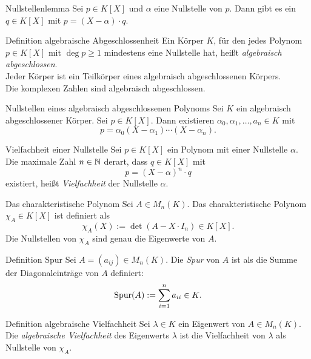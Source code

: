 \documentclass[main.tex]{subfiles}
\begin{document}
\begin{karte}{Nullstellenlemma}
    Sei \( p \in K[X] \) und \( \alpha \) eine Nullstelle 
    von \( p \). Dann gibt es ein \( q\in K[X] \) mit 
    \( p = (X - \alpha) \cdot q \).
\end{karte}
\begin{karte}{Definition algebraische Abgeschlossenheit}
    Ein Körper \( K \), für den jedes Polynom 
    \( p \in K[X] \) mit \( \deg p \geq 1 \) mindestens eine 
    Nullstelle hat, heißt \textit{algebraisch abgeschlossen}.\\
    Jeder Körper ist ein Teilkörper eines algebraisch 
    abgeschlossenen Körpers.\\
    Die komplexen Zahlen sind algebraisch abgeschlossen.
\end{karte}
\begin{karte}{Nullstellen eines algebraisch abgeschlossenen Polynoms}
    Sei \(K\) ein algebraisch abgeschlossener Körper. Sei 
    \( p \in K[X] \). Dann existieren 
    \( \alpha_0, \alpha_1, \ldots, a_n \in K \) mit 
    \[ p = \alpha_0 (X - \alpha_1) \cdots (X - \alpha_n). \]
\end{karte}
\begin{karte}{Vielfachheit einer Nullstelle}
    Sei \( p \in K[X] \) ein Polynom mit einer Nullstelle 
    \( \alpha \). Die maximale Zahl \( n \in \mathbb{N} \) derart, 
    dass \( q \in K[X] \) mit 
    \[ p = {(X - \alpha)}^n \cdot q \]
    existiert, heißt \textit{Vielfachheit} der Nullstelle 
    \( \alpha \).
\end{karte}
\begin{karte}{Das charakteristische Polynom}
    Sei \( A \in M_n(K) \). Das charakteristische Polynom 
    \( \chi_A \in K[X] \) ist definiert als 
    \[ \chi_A(X) := \det(A - X \cdot I_n) \in K[X]. \]
    Die Nullstellen von \( \chi_A \) sind genau die Eigenwerte 
    von \(A\).
\end{karte}
\begin{karte}{Definition Spur}
    Sei \( A = (a_{ij}) \in M_n(K) \). Die \textit{Spur} von 
    \(A\) ist als die Summe der Diagonaleinträge von \(A\) 
    definiert: 
    \[ \operatorname{Spur}(A) := \sum_{i=1}^n a_{ii} \in K. \]
\end{karte}
\begin{karte}{Definition algebraische Vielfachheit}
    Sei \( \lambda \in K \) ein Eigenwert von \(A \in M_n(K)\). 
    Die \textit{algebraische Vielfachheit} des Eigenwerts 
    \( \lambda \) ist die Vielfachheit von \( \lambda \) als 
    Nullstelle von \( \chi_A \).
\end{karte}
\end{document}
